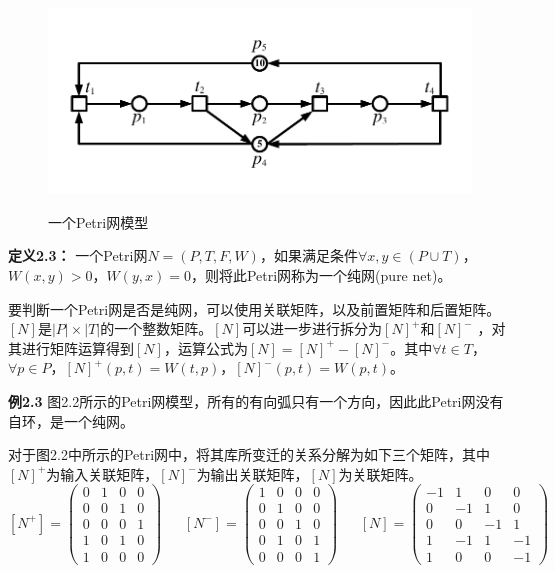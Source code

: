     \begin{figure}[H]
        \centering
        \includegraphics[scale=0.8,angle=0]{figures/figure2-2.pdf}\\
        \caption{一个Petri网模型}
    \end{figure}

    \textbf{定义2.3}\cite{murata1989petri}\textbf{：}
    一个Petri网$N = (P, T, F, W)$，如果满足条件$\forall x, y \in (P \cup T)$，$W(x, y)> 0$，$W(y, x) = 0$，则将此Petri网称为一个纯网(pure net)。
    
    要判断一个Petri网是否是纯网，可以使用关联矩阵，以及前置矩阵和后置矩阵。$[N]$是$|P| \times |T|$的一个整数矩阵。$[N]$可以进一步进行拆分为$[N]^+$和$[N]^-$ ，对其进行矩阵运算得到$[N]$，运算公式为$[N]=[N]^+ - [N]^- $。其中$\forall t \in T$，$\forall p \in P$，$[N]^+(p,t) = W(t, p)$，$[N]^-(p,t) = W(p, t)$。
    
    \textbf{例2.3}\hspace{0.5em}
    图2.2所示的Petri网模型，所有的有向弧只有一个方向，因此此Petri网没有自环，是一个纯网。

    对于图2.2中所示的Petri网中，将其库所变迁的关系分解为如下三个矩阵，其中$[N]^+$为输入关联矩阵，$[N]^-$为输出关联矩阵，$[N]$为关联矩阵。
    \begin{equation}\label{equaN}
    [N^+]=\begin{pmatrix}
    0&1&0&0\\
    0&0&1&0\\
    0&0&0&1\\
    1&0&1&0\\
    1&0&0&0
    \end{pmatrix}\ \ \ \ \ \ \
    [N^-]=\begin{pmatrix}
    1&0&0&0\\
    0&1&0&0\\
    0&0&1&0\\
    0&1&0&1\\
    0&0&0&1
    \end{pmatrix}\ \ \ \ \ \ \
    [N]=\begin{pmatrix}
    -1&1&0&0\\
    0& -1&1&0\\
    0 &0&-1&1\\
    1&-1 &1&-1\\
    1&0&0&-1
    \end{pmatrix}
    \end{equation}

